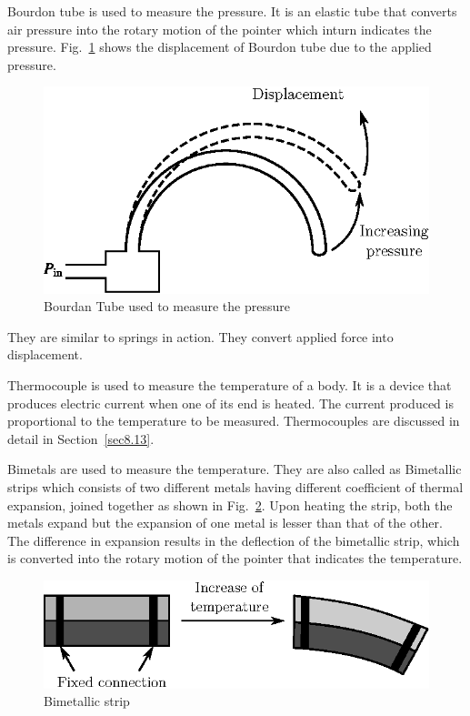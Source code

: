  Bourdon tube is used to measure the pressure. It is an elastic tube that converts air pressure into the rotary motion of the pointer which inturn indicates the pressure. Fig.~\ref{fig8.4} shows the displacement of Bourdon tube due to the applied pressure.
\begin{figure}[H]
\centering
\includegraphics{chap8/fig8.4.eps}
\caption{Bourdan Tube used to measure the pressure}\label{fig8.4}
\end{figure}

 They are similar to springs in action. They convert applied force into displacement.

\smallskip

 Thermocouple is used to measure the temperature of a body. It is a device that produces electric current when one of its end is heated. The current produced is proportional to the temperature to be measured. Thermocouples are discussed in detail in Section~\ref{sec8.13}.

\smallskip

 Bimetals are used to measure the temperature. They are also called as Bimetallic strips which consists of two different metals having different coefficient of thermal expansion, joined together as shown in Fig.~\ref{fig8.5}. Upon heating the strip, both the metals expand but the expansion of one metal is lesser than that of the other. The difference in expansion results in the deflection of the bimetallic strip, which is converted into the rotary motion of the pointer that indicates the temperature.
\begin{figure}[H]
\centering
\includegraphics{chap8/fig8.5.eps}
\caption{Bimetallic strip}\label{fig8.5}
\end{figure}

